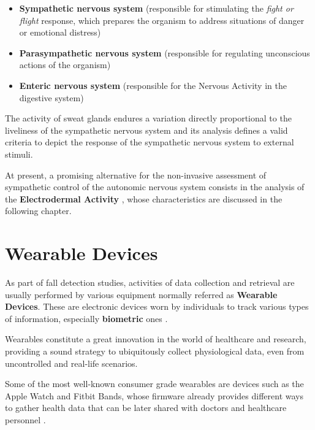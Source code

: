 \begin{itemize}
    \item \textbf{Sympathetic nervous system} (responsible for stimulating the \textit{fight or flight} response, which prepares the organism to address situations of danger or emotional distress)
    \item \textbf{Parasympathetic nervous system} (responsible for regulating unconscious actions of the organism)
    \item \textbf{Enteric nervous system} (responsible for the Nervous Activity in the digestive system)
\end{itemize}

The activity of sweat glands endures a variation directly proportional to the liveliness of the sympathetic nervous system and its analysis defines a valid criteria to depict the response of the sympathetic nervous system to external stimuli.

At present, a promising alternative for the non-invasive assessment of sympathetic control of the autonomic nervous system consists in the analysis of the \textbf{Electrodermal Activity} \cite{edaIntro1}, whose characteristics are discussed in the following chapter.

\section{Wearable Devices}\label{sec:wearables}


As part of fall detection studies, activities of data collection and retrieval are usually performed by various equipment normally referred as \textbf{Wearable Devices}. These are electronic devices worn by individuals to track various types of information, especially \textbf{biometric} ones \cite{wearablesDefinition}.

Wearables constitute a great innovation in the world of healthcare and research, providing a sound strategy to ubiquitously collect physiological data, even from uncontrolled and real-life scenarios.

Some of the most well-known consumer grade wearables are devices such as the Apple Watch and Fitbit Bands, whose firmware already provides different ways to gather health data that can be later shared with doctors and healthcare personnel \cite{wearablesBest}. 

